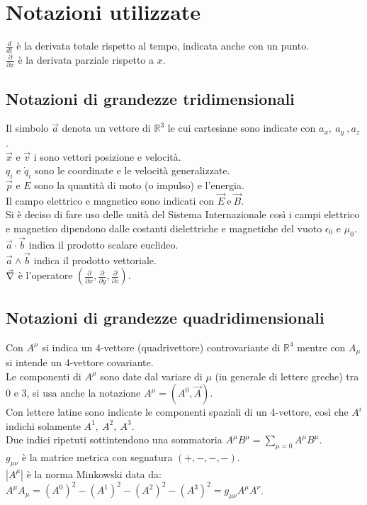 \section*{Notazioni utilizzate}
\vspace*{\fill}
$\frac{d}{dt}$ è la derivata totale rispetto al tempo, indicata anche con un punto.\\

$\frac{\partial}{\partial x}$ è la derivata parziale rispetto a $x$.\\
\subsection*{Notazioni di grandezze tridimensionali}
Il simbolo $\vec{a}$ denota un vettore di $\mathbb{R}^3$ le cui cartesiane sono indicate con $a_x,\ a_y\ , a_z$.\\
$\vec{x}$ e $\vec{v}$ i sono vettori posizione e velocità.\\
$q_i$ e $\dot q_i$ sono le coordinate e le velocità generalizzate. \\
$\vec{p}$ e $E$ sono la quantità di moto (o impulso) e l'energia.\\
Il campo elettrico e magnetico sono indicati con $\vec{E}\ \text{e}\ \vec{B}$.\\
Si è deciso di fare uso delle unità del Sistema Internazionale così i campi elettrico e magnetico dipendono dalle costanti dielettriche e magnetiche del vuoto $\epsilon_0$ e $\mu_0$.\\
$\vec a\cdot\vec b$ indica il prodotto scalare euclideo.\\
$\vec a\wedge\vec b$ indica il prodotto vettoriale.\\
$\vec{\nabla}$ è l'operatore $(\frac{\partial}{\partial x},\frac{\partial}{\partial y},\frac{\partial}{\partial z})$.\\
\subsection*{Notazioni di grandezze quadridimensionali}
Con $A^\mu$ si indica un 4-vettore (quadrivettore) controvariante di $\mathbb{R}^4$ mentre con $A_\mu$ si intende un 4-vettore covariante.\\
Le componenti di $A^\mu$ sono date dal variare di $\mu$ (in generale di lettere greche) tra $0$ e $3$, si usa anche la notazione $A^\mu=(A^0,\vec{A})$.\\
Con lettere latine sono indicate le componenti spaziali di un 4-vettore, così che $A^i$ indichi solamente $A^1,\ A^2,\ A^3$.\\
Due indici ripetuti sottintendono una sommatoria $A^\mu B^\mu=\sum_{\mu=0} A^\mu B^\mu$.\\
$g_{\mu \nu}$ è la matrice metrica con segnatura $(+,-,-,-)$.\\
$|A^\mu|$ è la norma Minkowski data da: $A^\mu A_\mu=(A^0)^2-(A^1)^2-(A^2)^2-(A^3)^2=g_{\mu \nu}A^\mu A^\nu$.\\
